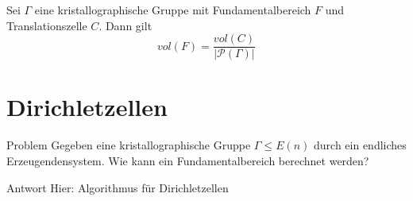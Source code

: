 \documentclass{beamer}
\theoremstyle{plain}
\newcommand\R{\mathbb R}
\renewcommand{\P}{\mathcal{P}}
\begin{document}
\begin{frame}
    \begin{theorem}
        Sei $\Gamma$ eine kristallographische Gruppe mit Fundamentalbereich $F$ und Translationszelle $C$. Dann gilt
        $$
            vol(F) = \frac{vol(C)}{|\P(\Gamma)|}
        $$
    \end{theorem}
\end{frame}

\section{Dirichletzellen}
\begin{frame}
    \begin{alertblock}{Problem}
        Gegeben eine kristallographische Gruppe $\Gamma \leq E(n)$ durch ein endliches Erzeugendensystem. Wie kann ein Fundamentalbereich berechnet werden?
    \end{alertblock}
    \pause
    \begin{exampleblock}{Antwort}
        Hier: Algorithmus für Dirichletzellen
    \end{exampleblock}
\end{frame}



\end{document}
